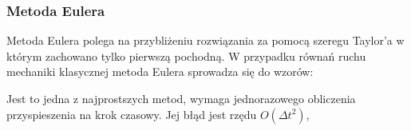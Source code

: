 
\subsubsection {Metoda Eulera}
Metoda Eulera polega na przybliżeniu rozwiązania za pomocą szeregu Taylor'a w którym zachowano tylko pierwszą pochodną.
W przypadku równań ruchu mechaniki klasycznej metoda Eulera sprowadza się  do wzorów:

\begin{center}

\end{center}

Jest to jedna z najprostszych metod, wymaga jednorazowego obliczenia przyspieszenia na krok czasowy.
Jej błąd jest rzędu $ O( \Delta t ^{2} ) $,